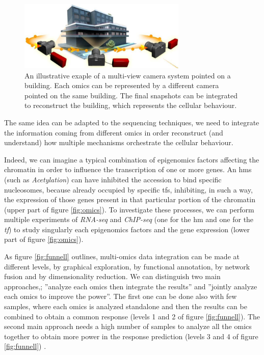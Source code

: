 \begin{figure}[h]
\centering
\includegraphics[width=8cm, keepaspectratio]{img/intro/cameras.png}
\caption[Integration cameras]{An illustrative exaple of a multi-view camera system pointed on a building.
Each omics can be represented by a different camera pointed on the same building. 
The final snapshots can be integrated to reconstruct the building, which represents the cellular behaviour.}
\label{fig:cameras}
\end{figure}

The same idea can be adapted to the sequencing techniques, we need to integrate the information coming from different omics in order reconstruct (and understand) how multiple mechanisms orchestrate the cellular behaviour.

Indeed, we can imagine a typical combination of epigenomics factors affecting the chromatin in order to influence the transcription of one or more genes.
An \glspl{hm} (such as \textit{Acetylation}) can have inhibited the accession to bind specific nucleosomes, because already occupied by specific \glspl{tf}, inhibiting, in such a way, the expression of those genes present in that particular portion of the chromatin (upper part of figure \ref{fig:omics}).
To investigate these processes, we can perform multiple experiments of \textit{RNA-seq} and \textit{ChIP-seq} (one for the \gls{hm} and one for the \textit{tf}) to study singularly each epigenomics factors and the gene expression (lower part of figure \ref{fig:omics}). 

As figure \ref{fig:funnell} outlines, multi-omics data integration can be made at different levels, by graphical exploration, by functional annotation, by network fusion and by dimensionality reduction.
We can distinguish two main approaches,; ''analyze each omics then integrate the results'' and ''jointly analyze each omics to improve the power''.
The first one can be done also with few samples, where each omics is analyzed standalone and then the results can be combined to obtain a common response (levels 1 and 2 of figure \ref{fig:funnell}).
The second main approach needs a high number of samples to analyze all the omics together to obtain more power in the response prediction (levels 3 and 4 of figure \ref{fig:funnell}) \cite{Rohart2017, Argelaguet2018, Jia2017, Meng2016}.

